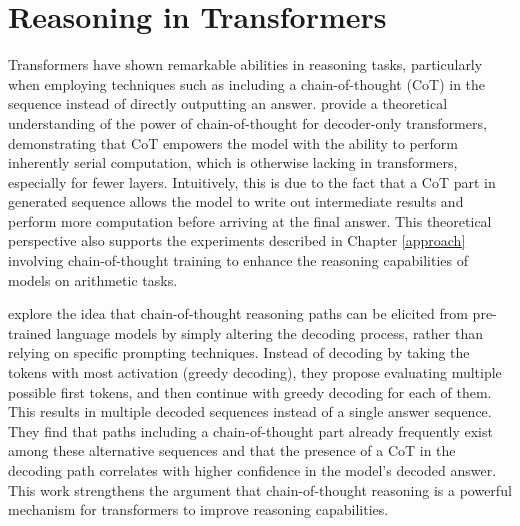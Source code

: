 \section{Reasoning in Transformers}\label{sec:sota_reasoning_in_transformers}

Transformers have shown remarkable abilities in reasoning tasks, particularly when employing techniques such as including a chain-of-thought (CoT) in the sequence instead of directly outputting an answer. \cite{li_chain_2024} provide a theoretical understanding of the power of chain-of-thought for decoder-only transformers, demonstrating that CoT empowers the model with the ability to perform inherently serial computation, which is otherwise lacking in transformers, especially for fewer layers. Intuitively, this is due to the fact that a CoT part in generated sequence allows the model to write out intermediate results and perform more computation before arriving at the final answer. This theoretical perspective also supports the experiments described in Chapter \ref{approach} involving chain-of-thought training to enhance the reasoning capabilities of models on arithmetic tasks.

\cite{wang_cot_2024} explore the idea that chain-of-thought reasoning paths can be elicited from pre-trained language models by simply altering the decoding process, rather than relying on specific prompting techniques. Instead of decoding by taking the tokens with most activation (greedy decoding), they propose evaluating multiple possible first tokens, and then continue with greedy decoding for each of them. This results in multiple decoded sequences instead of a single answer sequence. They find that paths including a chain-of-thought part already frequently exist among these alternative sequences and that the presence of a CoT in the decoding path correlates with higher confidence in the model's decoded answer. This work strengthens the argument that chain-of-thought reasoning is a powerful mechanism for transformers to improve reasoning capabilities.

